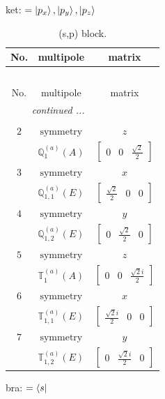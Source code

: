 \documentclass[fleqn,8pt,landscape]{jsarticle}
\begin{document}
\noindent
ket: $=\ket{p_{x}}, \ket{p_{y}}, \ket{p_{z}}$
\renewcommand{\arraystretch}{1.6}
\begin{longtable}{ccc}
\caption{(s,p) block.}
 \\
 \hline \hline
No. & multipole & matrix \\ \hline \endfirsthead

\multicolumn{2}{l}{\tablename\ \thetable{}} \\
 \hline \hline
No. & multipole & matrix \\ \hline \endhead

 \hline \hline
\multicolumn{2}{r}{\footnotesize\it continued ...} \\ \endfoot

 \hline \hline
\multicolumn{2}{r}{} \\ \endlastfoot

$ 2 $ & $ \text{symmetry} $ & $ z $ \\
$  $ & $ \mathbb{Q}_{1}^{(a)}(A) $ & $ \begin{bmatrix} 0 & 0 & \frac{\sqrt{2}}{2} \end{bmatrix} $ \\ \hline
$ 3 $ & $ \text{symmetry} $ & $ x $ \\
$  $ & $ \mathbb{Q}_{1,1}^{(a)}(E) $ & $ \begin{bmatrix} \frac{\sqrt{2}}{2} & 0 & 0 \end{bmatrix} $ \\ \hline
$ 4 $ & $ \text{symmetry} $ & $ y $ \\
$  $ & $ \mathbb{Q}_{1,2}^{(a)}(E) $ & $ \begin{bmatrix} 0 & \frac{\sqrt{2}}{2} & 0 \end{bmatrix} $ \\ \hline
$ 5 $ & $ \text{symmetry} $ & $ z $ \\
$  $ & $ \mathbb{T}_{1}^{(a)}(A) $ & $ \begin{bmatrix} 0 & 0 & \frac{\sqrt{2} i}{2} \end{bmatrix} $ \\ \hline
$ 6 $ & $ \text{symmetry} $ & $ x $ \\
$  $ & $ \mathbb{T}_{1,1}^{(a)}(E) $ & $ \begin{bmatrix} \frac{\sqrt{2} i}{2} & 0 & 0 \end{bmatrix} $ \\ \hline
$ 7 $ & $ \text{symmetry} $ & $ y $ \\
$  $ & $ \mathbb{T}_{1,2}^{(a)}(E) $ & $ \begin{bmatrix} 0 & \frac{\sqrt{2} i}{2} & 0 \end{bmatrix} $ \\ \hline
\end{longtable}
bra: $=\bra{s}$
\end{document}
